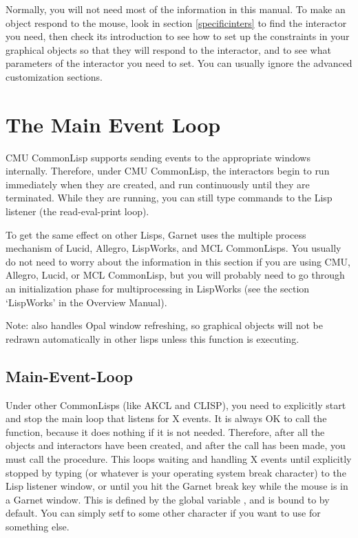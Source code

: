 Normally, you will not need most of the information in this manual.  To
make an object respond to the mouse, look in section \ref{specificinters}
to find the interactor you need, then check its introduction to see how to
set up the constraints in your graphical objects so that they will respond
to the interactor, and to see what parameters of the interactor you need to
set.  You can usually ignore the advanced customization sections.


\chapter{The Main Event Loop}
\label{notcmulisp}

CMU CommonLisp \cite{CMUCommonLisp} supports sending events to the
appropriate windows internally.  Therefore, under CMU CommonLisp, the
interactors begin to run immediately when they are created, and run
continuously until they are terminated.  While they are running, you can
still type commands to the Lisp listener (the read-eval-print loop).

To get the same effect on other Lisps, Garnet uses the multiple process
mechanism of Lucid, Allegro, LispWorks, and MCL CommonLisps.  You
usually do not need to worry about the information in this section if you are
using CMU, Allegro, Lucid, or MCL CommonLisp, but you will probably need to go
through an initialization phase for multiprocessing in LispWorks (see the
section `LispWorks' in the Overview Manual).

Note:  also handles Opal window refreshing, so graphical
objects will not be redrawn automatically in other lisps unless this
function is executing.


\section{Main-Event-Loop}

\label{Garnetbreakkey}

Under other CommonLisps (like AKCL and CLISP), you need to explicitly
start and stop the main loop that listens for X events.  It is always
OK to call the  function, because it does nothing
if it is not needed.  Therefore, after
all the objects and interactors have been created, and after the
 call has been made, you must call the
 procedure.  This loops waiting and handling X
events until explicitly stopped by typing  (or whatever is your
operating system break character) to the Lisp listener window, or until you
hit the Garnet break key while the mouse is in a Garnet window.  This
is defined by the global
variable , and is bound to  by
default.  You can simply setf  to some other
character if you want to use  for something else.

